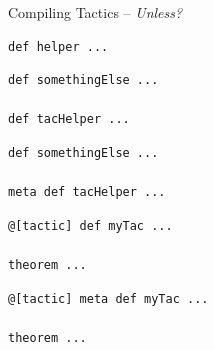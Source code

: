 \documentclass[en,t,navbarkit]{sdqbeamer}
\begin{document}
\begin{frame}[fragile]{Compiling Tactics -- \emph{Unless?}}

\begin{lrbox}{\abox}
  \begin{minipage}{2.5cm}
\begin{verbatim}
def helper ...
\end{verbatim}
  \end{minipage}
\end{lrbox}

\begin{lrbox}{\bbox}
  \begin{minipage}{3.7cm}
\begin{verbatim}
def somethingElse ...

def tacHelper ...
\end{verbatim}
  \end{minipage}
\end{lrbox}

\begin{lrbox}{\bboxb}
  \begin{minipage}{3.7cm}
\begin{verbatim}
def somethingElse ...

meta def tacHelper ...
\end{verbatim}
  \end{minipage}
\end{lrbox}

\begin{lrbox}{\tbox}
  \begin{minipage}{5cm}
\begin{verbatim}
@[tactic] def myTac ...

theorem ...
\end{verbatim}
  \end{minipage}
\end{lrbox}

\begin{lrbox}{\tboxb}
  \begin{minipage}{5cm}
\begin{verbatim}
@[tactic] meta def myTac ...

theorem ...
\end{verbatim}
  \end{minipage}
\end{lrbox}


\end{frame}
\end{document}
